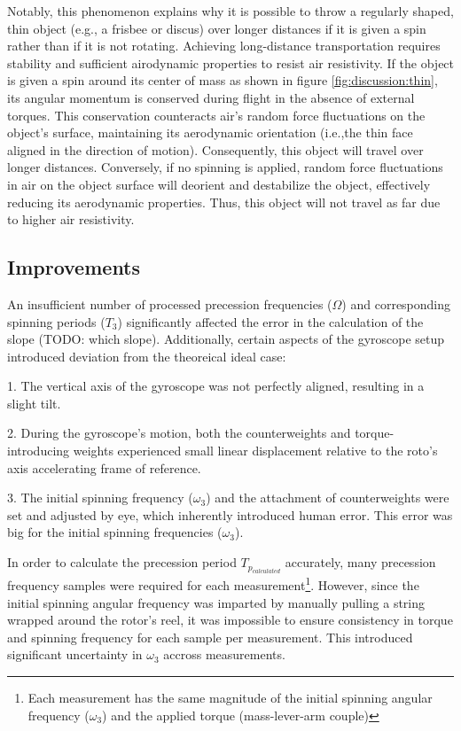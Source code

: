 Notably, this phenomenon explains why it is possible to throw a regularly shaped, thin object (e.g., a frisbee or discus) over longer distances if it is given a spin rather than if it is not rotating. Achieving long-distance transportation requires stability and sufficient airodynamic properties to resist air resistivity. If the object is given a spin around its center of mass as shown in figure \ref{fig:discussion:thin}, its angular momentum is conserved during flight in the absence of external torques. This conservation counteracts air's random force fluctuations on the object's surface, maintaining its aerodynamic orientation (i.e.,the thin face aligned in the direction of motion). Consequently, this object will travel over longer distances. Conversely, if no spinning is applied, random force fluctuations in air on the object surface will deorient and destabilize the object, effectively reducing its aerodynamic properties. Thus, this object will not travel as far due to higher air resistivity. 

\subsection{Improvements} \label{sec:discussion:improvements}

An insufficient number of processed precession frequencies ($\Omega$) and corresponding spinning periods ($T_{3}$) significantly affected the error in the calculation of the slope (TODO: which slope). Additionally, certain aspects of the gyroscope setup introduced deviation from the theoreical ideal case:

1. The vertical axis of the gyroscope was not perfectly aligned, resulting in a slight tilt.

2. During the gyroscope's motion, both the counterweights and torque-introducing weights experienced small linear displacement relative to the roto's axis accelerating frame of reference.

3. The initial spinning frequency ($\omega_{3}$) and the attachment of counterweights were set and adjusted by eye, which inherently introduced human error. This error was big for the initial spinning frequencies ($\omega_{3}$).

In order to calculate the precession period $T_{p_{calculated}}$ accurately, many precession frequency samples were required for each measurement\footnote{Each measurement has the same magnitude of the initial spinning angular frequency ($\omega_{3}$) and the applied torque (mass-lever-arm couple)}. However, since the initial spinning angular frequency was imparted by manually pulling a string wrapped around the rotor's reel, it was impossible to ensure consistency in torque and spinning frequency for each sample per measurement. This introduced significant uncertainty in $\omega_{3}$ accross measurements.

